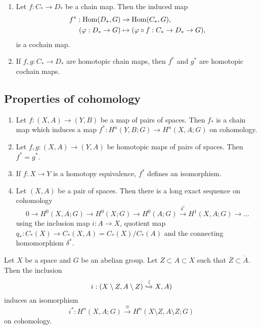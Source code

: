 \begin{lemma}
    \hspace{0em}
    \begin{enumerate}
        \item     Let $f: C_* \to D_*$ be a chain map. Then the induced map
              \begin{align*}
                  f^*: \operatorname{Hom}(D_*, G)    & \to \operatorname{Hom}(C_*, G),                             \\
                  (\varphi: D_* \to G) & \mapsto (\varphi \circ f: C_* \to D_* \to G),
              \end{align*}
              is a cochain map.
        \item If $f, g: C_* \to D_*$ are homotopic chain maps, then $f^*$ and $g^*$ are homotopic cochain maps.
    \end{enumerate}
\end{lemma}

\subsection{Properties of cohomology}

\begin{enumerate}
    \item Let $f: (X, A) \to (Y, B)$ be a map of pairs of spaces. Then $f_*$ is a chain map which induces a map $f^*: H^n(Y, B; G) \to H^n(X, A; G)$ on cohomology.
    \item Let $f, g: (X,A) \to (Y,A)$ be homotopic maps of pairs of spaces. Then $f^* = g^*$.
    \item If $f: X \to Y$ is a homotopy equivalence, $f^*$ defines an isomorphism.
    \item Let $(X, A)$ be a pair of spaces. Then there is a long exact sequence on cohomology \[
              0 \to H^0(X, A; G) \to H^0(X; G) \to H^0(A; G) \xrightarrow{\delta^*} H^1(X,A;G) \to \ldots
          \]
          using the inclusion map $i: A \to X$, quotient map $q_*: C_*(X) \to C_*(X,A) = C_*(X)/C_*(A)$ and the connecting homomorphism $\delta^*$.
\end{enumerate}

\begin{theorem}
    Let $X$ be a space and $G$ be an abelian group. Let $Z \subset A \subset X$ such that $\overline Z \subset \mathring A$. Then the inclusion
    \[
        i: (X \setminus Z, A \setminus Z) \xhookrightarrow
        (X,A)
    \]
    induces an isomorphism
    \[
        i^*: H^n(X, A; G) \xrightarrow{\cong} H^n(X \setminus Z, A \setminus Z; G)
    \]
    on cohomology.
\end{theorem}

